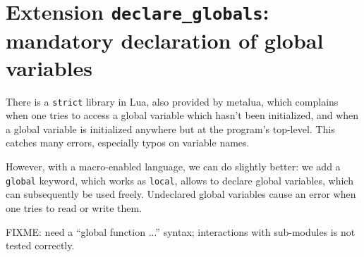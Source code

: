 \section{Extension {\tt declare\_globals}: mandatory declaration of global
  variables}
There is a {\tt strict} library in Lua, also provided by metalua, which
complains when one tries to access a global variable which hasn't been
initialized, and when a global variable is initialized anywhere but at the
program's top-level. This catches many errors, especially typos on variable
names. 

However, with a macro-enabled language, we can do slightly better: we add a {\tt
  global} keyword, which works as {\tt local}, allows to declare global
variables, which can subsequently be used freely. Undeclared global variables
cause an error when one tries to read or write them.

FIXME: need a ``global function ...'' syntax; interactions with sub-modules is
not tested correctly.
